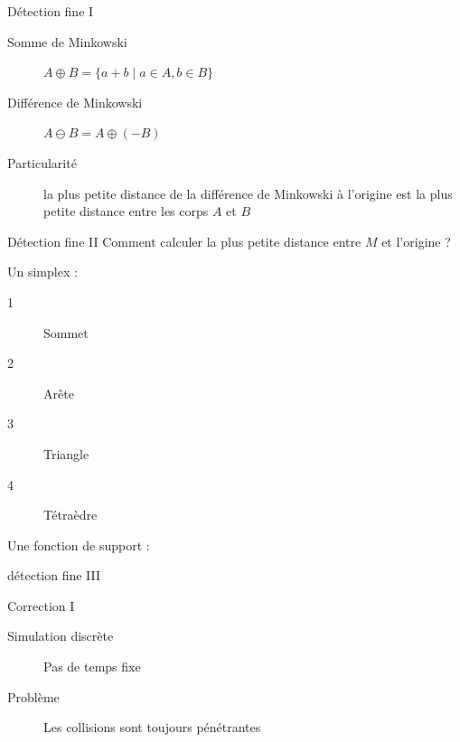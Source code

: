 \documentclass{beamer}
\begin{document}
\begin{frame}{Détection fine I}
  \begin{description}
    \item[Somme de Minkowski]
      $A \oplus B = \{a + b \mid a \in A, b \in B\}$
    \item[Différence de Minkowski]
      $A \ominus B = A \oplus (-B)$
  \end{description}

  \begin{figure}
    \centering
    
    
  \end{figure}

  \begin{description}
    \item[Particularité]
      la plus petite distance de la différence de Minkowski à l'origine est la plus petite distance entre les corps $A$ et $B$
  \end{description}
\end{frame}

\begin{frame}{Détection fine II}
  Comment calculer la plus petite distance entre $M$ et l'origine ?

  Un simplex :
  \begin{description}
    \item[1] Sommet
    \item[2] Arête
    \item[3] Triangle
    \item[4] Tétraèdre
  \end{description}

  Une fonction de support :
\end{frame}

\begin{frame}{détection fine III}
  \begin{figure}
    \centering
    
    
    
    
    
    
  \end{figure}
\end{frame}

\begin{frame}{Correction I}
  \begin{description}
    \item[Simulation discrète] Pas de temps fixe
    \item[Problème] Les collisions sont toujours pénétrantes
  \end{description}

  \vfill

  \begin{figure}
    \centering
    
  \end{figure}
\end{frame}
\end{document}

